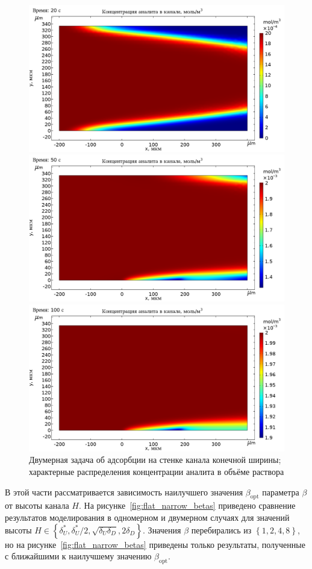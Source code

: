 \documentclass[oneside,final,12pt]{extreport}
\begin{document}
\begin{figure}
  \centering
  \includegraphics[width=.6\textwidth]{pic/flat_narrow_plate_20s}

  \includegraphics[width=.6\textwidth]{pic/flat_narrow_plate_50s}

  \includegraphics[width=.6\textwidth]{pic/flat_narrow_plate_100s}

  \caption{%
    \label{fig:flat_narrow_two_surf_concdistrib}%
    Двумерная задача об адсорбции на стенке канала конечной ширины;
    характерные распределения концентрации аналита в объёме раствора
  }

\end{figure}

В этой части рассматривается зависимость наилучшего значения
$\beta_\text{opt}$ параметра $\beta$ от высоты канала $H$.
На рисунке~\ref{fig:flat_narrow_betas} приведено сравнение
результатов моделирования в одномерном и двумерном случаях
для значений высоты
$H \in \left\{\delta_U^*, \delta_U^*/2, \sqrt{\delta_U\delta_D}, 2\delta_D\right\}$.
Значения $\beta$ перебирались из $\left\{1, 2, 4, 8\right\}$,
но на рисунке~\ref{fig:flat_narrow_betas} приведены только результаты,
полученные с ближайшими к наилучшему значению $\beta_\text{opt}$.
\end{document}
